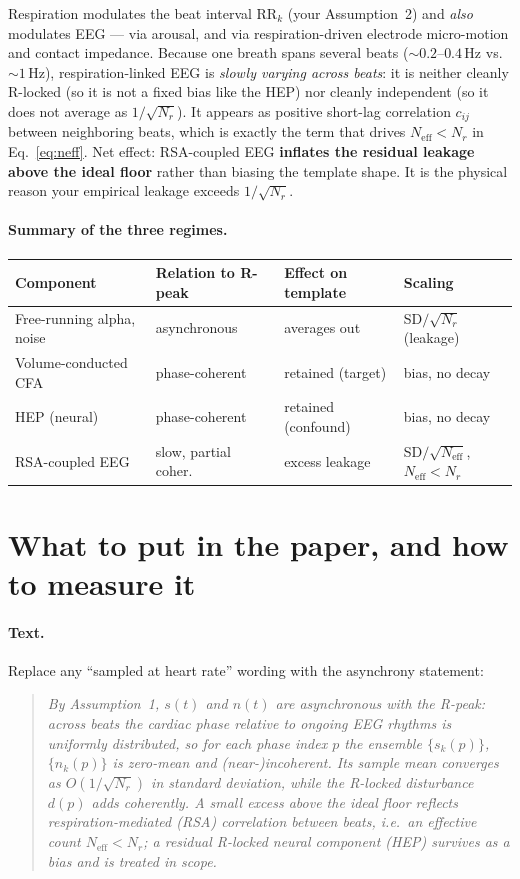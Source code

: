 \documentclass[11pt]{article}
\begin{document}
Respiration modulates the beat interval $\mathrm{RR}_k$ (your Assumption~2) and \emph{also}
modulates EEG --- via arousal, and via respiration-driven electrode micro-motion and contact
impedance. Because one breath spans several beats ($\sim\!0.2$--$0.4$\,Hz vs.\ $\sim\!1$\,Hz),
respiration-linked EEG is \emph{slowly varying across beats}: it is neither cleanly R-locked (so
it is not a fixed bias like the HEP) nor cleanly independent (so it does not average as
$1/\sqrt{N_r}$). It appears as positive short-lag correlation $c_{ij}$ between neighboring beats,
which is exactly the term that drives $N_{\mathrm{eff}}<N_r$ in Eq.~\eqref{eq:neff}. Net effect:
RSA-coupled EEG \textbf{inflates the residual leakage above the ideal floor} rather than biasing
the template shape. It is the physical reason your empirical leakage exceeds $1/\sqrt{N_r}$.

\paragraph{Summary of the three regimes.}
\begin{center}
\begin{tabular}{@{}llll@{}}
\toprule
Component & Relation to R-peak & Effect on template & Scaling \\
\midrule
Free-running alpha, noise & asynchronous       & averages out        & SD$/\sqrt{N_r}$ (leakage) \\
Volume-conducted CFA      & phase-coherent      & retained (target)   & bias, no decay \\
HEP (neural)              & phase-coherent      & retained (confound) & bias, no decay \\
RSA-coupled EEG           & slow, partial coher.& excess leakage      & SD$/\sqrt{N_{\mathrm{eff}}}$, $N_{\mathrm{eff}}\!<\!N_r$ \\
\bottomrule
\end{tabular}
\end{center}

\section{What to put in the paper, and how to measure it}

\paragraph{Text.} Replace any ``sampled at heart rate'' wording with the asynchrony statement:
\begin{quote}\itshape
By Assumption~1, $s(t)$ and $n(t)$ are asynchronous with the R-peak: across beats the cardiac
phase relative to ongoing EEG rhythms is uniformly distributed, so for each phase index $p$ the
ensemble $\{s_k(p)\}$, $\{n_k(p)\}$ is zero-mean and (near-)incoherent. Its sample mean converges
as $O(1/\sqrt{N_r})$ in standard deviation, while the R-locked disturbance $d(p)$ adds coherently.
A small excess above the ideal floor reflects respiration-mediated (RSA) correlation between
beats, i.e.\ an effective count $N_{\mathrm{eff}}<N_r$; a residual R-locked \emph{neural}
component (HEP) survives as a bias and is treated in scope.
\end{quote}
\end{document}
